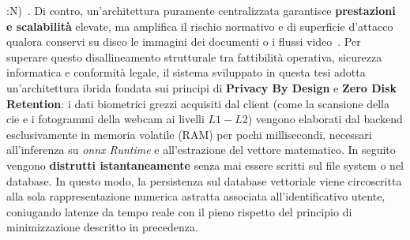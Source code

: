 :N)~\cite{sanzGoverningPrivacyPreservingFace2026}.
Di contro, un'architettura puramente centralizzata garantisce \textbf{prestazioni e scalabilità} elevate, ma amplifica il rischio normativo e di superficie d'attacco qualora conservi su disco le immagini dei documenti o i flussi video~\cite{sanzGoverningPrivacyPreservingFace2026}.
Per superare questo disallineamento strutturale tra fattibilità operativa, sicurezza informatica e conformità legale, il sistema sviluppato in questa tesi adotta un'architettura ibrida fondata sui principi di \textbf{Privacy By Design} e \textbf{Zero Disk Retention}: i dati biometrici grezzi acquisiti dal client (come la scansione della \gls{cie} e i fotogrammi della webcam ai livelli $L1-L2$) vengono elaborati dal backend esclusivamente in memoria volatile (RAM) per pochi millisecondi, necessari all'inferenza su \textit{\gls{onnx} Runtime} e all'estrazione del vettore matematico. In seguito vengono \textbf{distrutti istantaneamente} senza mai essere scritti sul file system o nel database. In questo modo, la persistenza sul database vettoriale viene circoscritta alla sola rappresentazione numerica astratta associata all'identificativo utente, coniugando latenze da tempo reale con il pieno rispetto del principio di minimizzazione descritto in precedenza.
